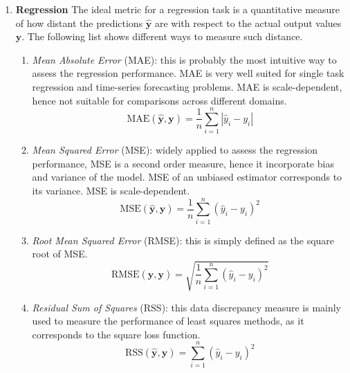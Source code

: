     \begin{enumerate}
    	\item[] \textbf{Regression}
    	The ideal metric for a regression task is a quantitative measure of how distant the predictions $\bm{\hat  y}$ are with respect to the actual output values $\bm{y}$. The following list shows different ways to measure such distance.
    	\begin{enumerate}[label=(\roman*)]
    		\item \textit{Mean Absolute Error} (\ac{MAE}): this is probably the most intuitive way to assess the regression performance. MAE is very well suited for single task regression and time-series forecasting problems. MAE is scale-dependent, hence not suitable for comparisons across different domains.
    		\begin{equation} \label{eq:metrics_mae}
    			\text{MAE}(\bm{\hat y}, \bm{y}) = \frac{1}{n}\sum_{i=1}^n|\hat y_i - y_i|
    		\end{equation}
    		
    		\item \textit{Mean Squared Error} (\ac{MSE}): widely applied to assess the regression performance, MSE is a second order measure, hence it incorporate bias and variance of the model. MSE of an unbiased estimator corresponds to its variance. MSE is scale-dependent.
    		\begin{equation} \label{eq:metrics_mse}
	   			\text{MSE}(\bm{\hat y}, \bm{y}) = \frac{1}{n}\sum_{i=1}^n(\hat y_i - y_i)^2
    		\end{equation}
    		
    		\item \textit{Root Mean Squared Error} (\ac{RMSE}): this is simply defined as the square root of MSE.
    		\begin{equation} \label{eq:metrics_rmse}
    			\text{RMSE}(\bm{\hat y}, \bm{y}) = \sqrt{\frac{1}{n}\sum_{i=1}^n(\hat y_i - y_i)^2}
    		\end{equation}

    		\item \textit{Residual Sum of Squares} (\ac{RSS}): this data discrepancy measure is mainly used to measure the performance of least squares methods, as it corresponds to the square loss function.
    		\begin{equation} \label{eq:metrics_rss}
    			\text{RSS}(\bm{\hat y}, \bm{y}) = \sum_{i=1}^n(\hat y_i - y_i)^2
    		\end{equation}
    		

\end{enumerate}
\end{enumerate}
